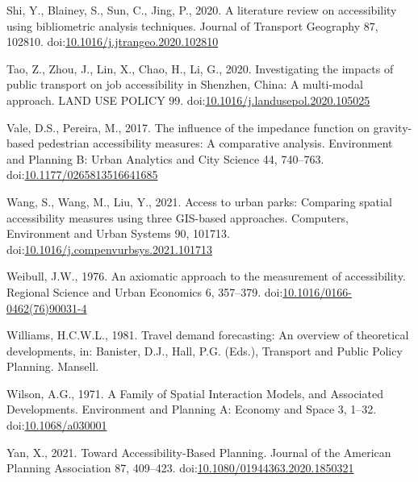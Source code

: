 \documentclass[]{elsarticle} %
\newlength{\cslhangindent}
\newlength{\cslentryspacingunit} %
\newenvironment{CSLReferences}[2] %
 {%
  \setlength{\parindent}{0pt}
  \ifodd #1
  \let\oldpar\par
  \def\par{\hangindent=\cslhangindent\oldpar}
  \fi
  \setlength{\parskip}{#2\cslentryspacingunit}
 }%
 {}
\begin{document}
\begin{CSLReferences}{1}{0}
\leavevmode{}%
Shi, Y., Blainey, S., Sun, C., Jing, P., 2020. A literature review on
accessibility using bibliometric analysis techniques. Journal of
Transport Geography 87, 102810.
doi:\href{https://doi.org/10.1016/j.jtrangeo.2020.102810}{10.1016/j.jtrangeo.2020.102810}

\leavevmode{}%
Tao, Z., Zhou, J., Lin, X., Chao, H., Li, G., 2020. Investigating the
impacts of public transport on job accessibility in {Shenzhen}, {China}:
A multi-modal approach. LAND USE POLICY 99.
doi:\href{https://doi.org/10.1016/j.landusepol.2020.105025}{10.1016/j.landusepol.2020.105025}

\leavevmode{}%
Vale, D.S., Pereira, M., 2017. The influence of the impedance function
on gravity-based pedestrian accessibility measures: {A} comparative
analysis. Environment and Planning B: Urban Analytics and City Science
44, 740--763.
doi:\href{https://doi.org/10.1177/0265813516641685}{10.1177/0265813516641685}

\leavevmode{}%
Wang, S., Wang, M., Liu, Y., 2021. Access to urban parks: {Comparing}
spatial accessibility measures using three {GIS}-based approaches.
Computers, Environment and Urban Systems 90, 101713.
doi:\href{https://doi.org/10.1016/j.compenvurbsys.2021.101713}{10.1016/j.compenvurbsys.2021.101713}

\leavevmode{}%
Weibull, J.W., 1976. An axiomatic approach to the measurement of
accessibility. Regional Science and Urban Economics 6, 357--379.
doi:\href{https://doi.org/10.1016/0166-0462(76)90031-4}{10.1016/0166-0462(76)90031-4}

\leavevmode{}%
Williams, H.C.W.L., 1981. Travel demand forecasting: An overview of
theoretical developments, in: Banister, D.J., Hall, P.G. (Eds.),
Transport and Public Policy Planning. Mansell.

\leavevmode{}%
Wilson, A.G., 1971. A Family of Spatial Interaction Models, and
Associated Developments. Environment and Planning A: Economy and Space
3, 1--32. doi:\href{https://doi.org/10.1068/a030001}{10.1068/a030001}

\leavevmode{}%
Yan, X., 2021. Toward Accessibility-Based Planning. Journal of the
American Planning Association 87, 409--423.
doi:\href{https://doi.org/10.1080/01944363.2020.1850321}{10.1080/01944363.2020.1850321}


\end{CSLReferences}
\end{document}
